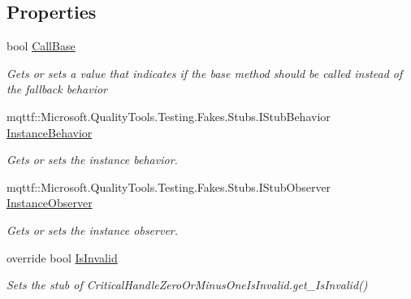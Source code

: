 \subsection*{Properties}
\begin{DoxyCompactItemize}
\item 
bool \hyperlink{class_microsoft_1_1_win32_1_1_safe_handles_1_1_fakes_1_1_stub_critical_handle_zero_or_minus_one_is_invalid_a70e92a85d6e334f86cc29fe68afe4dc9}{Call\-Base}
\begin{DoxyCompactList}\small\item\em Gets or sets a value that indicates if the base method should be called instead of the fallback behavior\end{DoxyCompactList}\item 
mqttf\-::\-Microsoft.\-Quality\-Tools.\-Testing.\-Fakes.\-Stubs.\-I\-Stub\-Behavior \hyperlink{class_microsoft_1_1_win32_1_1_safe_handles_1_1_fakes_1_1_stub_critical_handle_zero_or_minus_one_is_invalid_a53bcf2cfae5135dc457a5d2ecc8b0832}{Instance\-Behavior}
\begin{DoxyCompactList}\small\item\em Gets or sets the instance behavior.\end{DoxyCompactList}\item 
mqttf\-::\-Microsoft.\-Quality\-Tools.\-Testing.\-Fakes.\-Stubs.\-I\-Stub\-Observer \hyperlink{class_microsoft_1_1_win32_1_1_safe_handles_1_1_fakes_1_1_stub_critical_handle_zero_or_minus_one_is_invalid_a9f06b26620a6e4dc0f903b3f341730d3}{Instance\-Observer}
\begin{DoxyCompactList}\small\item\em Gets or sets the instance observer.\end{DoxyCompactList}\item 
override bool \hyperlink{class_microsoft_1_1_win32_1_1_safe_handles_1_1_fakes_1_1_stub_critical_handle_zero_or_minus_one_is_invalid_a2f8f0b9f670419660dd397e7bb0a6074}{Is\-Invalid}
\begin{DoxyCompactList}\small\item\em Sets the stub of Critical\-Handle\-Zero\-Or\-Minus\-One\-Is\-Invalid.\-get\-\_\-\-Is\-Invalid()\end{DoxyCompactList}\end{DoxyCompactItemize}


